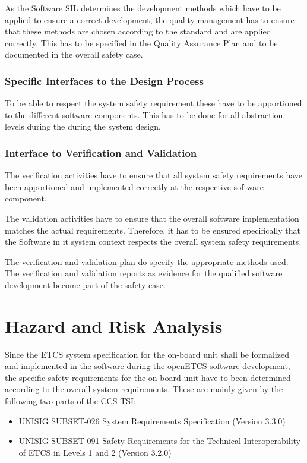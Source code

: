 \documentclass{template/openetcs_report}
\begin{document}
As the Software SIL determines the development methods which have to be applied to ensure a correct development, the quality management has to ensure that these methods are chosen according to the standard and are applied correctly. This has to be specified in the Quality Assurance Plan and to be documented in the overall safety case.

\subsection{Specific Interfaces to the Design Process}

To be able to respect the system safety requirement these have to be apportioned to the different software components. This has to be done for all abstraction levels during the during the system design. 

\subsection{Interface to Verification and Validation}

The verification activities have to ensure that all system safety requirements have been apportioned and implemented correctly at the respective software component.

The validation activities have to ensure that the overall software implementation matches the actual requirements. Therefore, it has to be ensured specifically that the Software in it system context respects the overall system safety requirements.

The verification and validation plan do specify the appropriate methods used. The verification and validation reports as evidence for the qualified software development become part of the safety case.


\chapter{Hazard and Risk Analysis}

Since the ETCS system specification for the on-board unit shall be formalized and implemented in the software during the openETCS software development, the specific safety requirements for the on-board unit have to been determined according to the overall system requirements. These are mainly given by the following two parts of the CCS TSI:

\begin{itemize}
\item UNISIG SUBSET-026	System Requirements Specification 	(Version 3.3.0)
\item UNISIG SUBSET-091 Safety Requirements for the Technical Interoperability of ETCS in Levels 1 and 2 	(Version 3.2.0)
\end{itemize}
\end{document}
